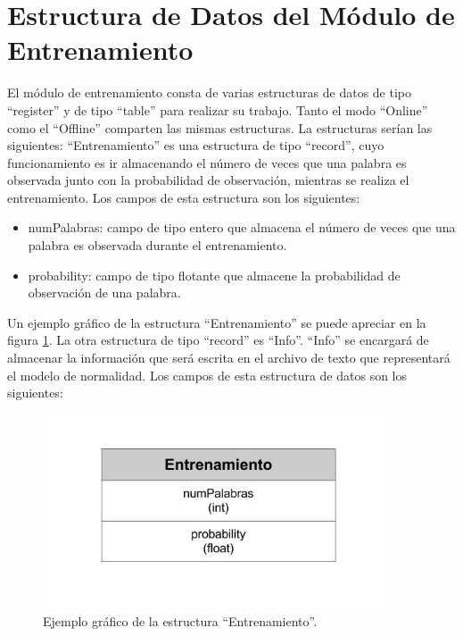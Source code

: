 \section*{Estructura de Datos del Módulo de Entrenamiento}
El módulo de entrenamiento consta de varias estructuras de datos de
tipo ``register'' y de tipo ``table'' para realizar su trabajo. Tanto el modo
``Online'' como el ``Offline'' comparten las mismas estructuras.
La estructuras serían las siguientes:
``Entrenamiento'' es una estructura de tipo ``record'', cuyo funcionamiento es ir almacenando el número de veces que una palabra es observada junto con la probabilidad de observación, mientras se realiza el entrenamiento. Los
campos de esta estructura son los siguientes:

\begin{itemize}
\item numPalabras: campo de tipo entero que almacena el número de veces
que una palabra es observada durante el entrenamiento.
\item probability: campo de tipo flotante que almacene la probabilidad de observación de una palabra.
\end{itemize}

Un ejemplo gráfico de la estructura ``Entrenamiento'' se puede apreciar
en la figura \ref{fig:figEntrenamiento}.
La otra estructura de tipo ``record'' es ``Info''. ``Info'' se encargará de
almacenar la información que será escrita en el archivo de texto que representará el modelo de normalidad. Los campos de esta estructura de datos
son los siguientes:

\begin{figure}[!htb]
\begin{center}
\includegraphics[width=4in]{./img/EntrenamientoRegister.jpg}
\caption{Ejemplo gráfico de la estructura ``Entrenamiento''.}
\label{fig:figEntrenamiento}
\end{center}
\end{figure}	

